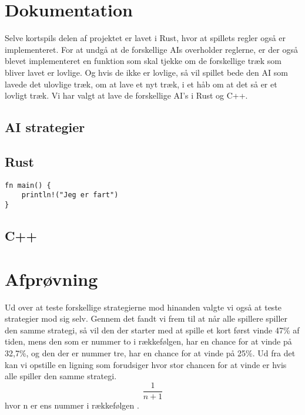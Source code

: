 \documentclass[a4paper, 12pt]{article}
\begin{document}
\vfill
\pagebreak

\section{Dokumentation}

Selve kortspils delen af projektet er lavet i Rust, hvor at spillets regler også er implementeret. For at undgå at de forskellige AIs overholder reglerne, er der også blevet implementeret en funktion som skal tjekke om de forskellige træk som bliver lavet er lovlige. Og hvis de ikke er lovlige, så vil spillet bede den AI som lavede det ulovlige træk, om at lave et nyt træk, i et håb om at det så er et lovligt træk. Vi har valgt at lave de forskellige AI's i Rust og C++.

\subsection{AI strategier}







\vfill
\pagebreak


\subsection{Rust}


\begin{verbatim}
fn main() {
	println!("Jeg er fart")
}
\end{verbatim}


\subsection{C++}



\vfill
\pagebreak

\section{Afprøvning}











Ud over at teste forskellige strategierne mod hinanden valgte vi også at teste strategier mod sig selv. Gennem det fandt vi frem til at når alle spillere spiller den samme strategi, så vil den der starter med at spille et kort først vinde 47\% af tiden, mens den som er nummer to i rækkefølgen, har en chance for at vinde på 32,7\%, og den der er nummer tre, har en chance for at vinde på 25\%. Ud fra det kan vi opstille en ligning som forudsiger hvor stor chancen for at vinde er hvis alle spiller den samme strategi.
$$\frac{1}{n+1}$$ hvor n er ens nummer i rækkefølgen . 
\end{document}
